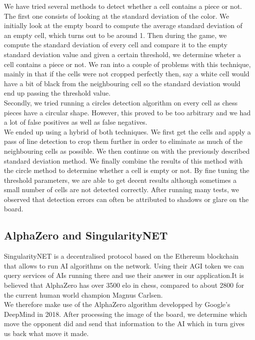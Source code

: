 \documentclass[11pt]{article}
\begin{document}
We have tried
several methods to detect whether a cell contains a piece or not. The first one
consists of looking at the standard deviation of the color. We initially look at
the empty board to compute the average standard deviation of an empty cell,
which turns out to be around 1. Then during the game, we compute the standard
deviation of every cell and compare it to the empty standard deviation value and
given a certain threshold, we determine wheter a cell contains a piece or not.
We ran into a couple of problems with this technique, mainly in that if the
cells were not cropped perfectly then, say a white cell would have a bit of
black from the neighbouring cell so the standard deviation would end up passing
the threshold value.\\

Secondly, we tried running a circles detection algorithm on every cell as chess
pieces have a circular shape. However, this proved to be too arbitrary and we
had a lot of false positives as well as false negatives.\\

We ended up using a hybrid of both techniques. We first get the cells and apply
a pass of line detection to crop them further in order to eliminate as much of
the neighbouring cells as possible. We then continue on with the previously
described standard deviation method. We finally combine the results of this
method with the circle method to determine whether a cell is empty or not. By
fine tuning the threshold parameters, we are able to get decent results although
sometimes a small number of cells are not detected correctly. After running many
tests, we observed that detection errors can often be attributed to shadows or
glare on the board.\\

\subsection{AlphaZero and SingularityNET}

SingularityNET is a decentralised protocol based on the Ethereum blockchain that
allows to run AI algorithms on the network. Using their AGI token we can query
services of AIs running there and use their answer in our application.It is
believed that AlphaZero has over 3500 elo in chess, compared to about 2800 for
the current human world champion Magnus Carlsen.\\

We therefore make use of the
AlphaZero algorithm developped by Google's DeepMind in 2018. After processing
the image of the board, we determine which move the opponent did and send that
information to the AI which in turn gives us back what move it made.\\
\end{document}
